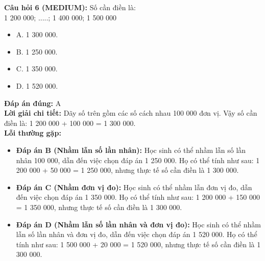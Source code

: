 \documentclass{article}
\begin{document}
\begin{minipage}{\textwidth}
\noindent\textbf{Câu hỏi 6 (MEDIUM):} Số cần điền là: \\
1 200 000; .....; 1 400 000; 1 500 000 
\begin{itemize}[label={}]
    \item A. 1 300 000.
    \item B. 1 250 000.
    \item C. 1 350 000.
    \item D. 1 520 000.
\end{itemize}
\textbf{Đáp án đúng:} A \\
\textbf{Lời giải chi tiết:} Dãy số trên gồm các số cách nhau 100 000 đơn vị. Vậy số cần điền là: 1 200 000 + 100 000 = 1 300 000. \\
\textbf{Lỗi thường gặp:}
\begin{itemize}
  \item \textbf{Đáp án B (Nhầm lẫn số lần nhân):} Học sinh có thể nhầm lẫn số lần nhân 100 000, dẫn đến việc chọn đáp án 1 250 000. Họ có thể tính như sau: 1 200 000 + 50 000 = 1 250 000, nhưng thực tế số cần điền là 1 300 000.
  \item \textbf{Đáp án C (Nhầm đơn vị đo):} Học sinh có thể nhầm lẫn đơn vị đo, dẫn đến việc chọn đáp án 1 350 000. Họ có thể tính như sau: 1 200 000 + 150 000 = 1 350 000, nhưng thực tế số cần điền là 1 300 000.
  \item \textbf{Đáp án D (Nhầm lẫn số lần nhân và đơn vị đo):} Học sinh có thể nhầm lẫn số lần nhân và đơn vị đo, dẫn đến việc chọn đáp án 1 520 000. Họ có thể tính như sau: 1 500 000 + 20 000 = 1 520 000, nhưng thực tế số cần điền là 1 300 000.
\end{itemize}
\end{minipage}
\vspace{1em}
\end{document}
